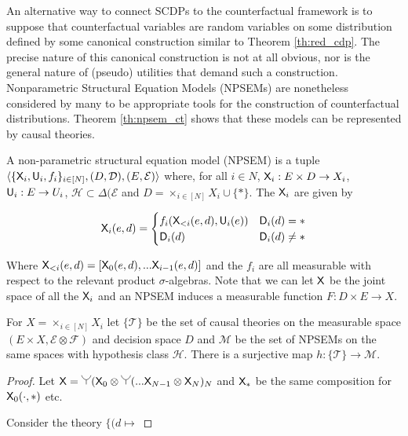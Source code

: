 An alternative way to connect SCDPs to the counterfactual framework is to suppose that counterfactual variables are random variables on some distribution defined by some canonical construction similar to Theorem \ref{th:red_cdp}. The precise nature of this canonical construction is not at all obvious, nor is the general nature of (pseudo) utilities that demand such a construction. Nonparametric Structural Equation Models (NPSEMs) are nonetheless considered by many to be appropriate tools for the construction of counterfactual distributions. Theorem \ref{th:npsem_ct} shows that these models can be represented by causal theories.

\begin{definition}[NPSEM]\label{def:NPSEM}
A non-parametric structural equation model (NPSEM) is a tuple $\langle \{\mathsf{X}_i, \mathsf{U}_i, f_i\}_{i\in[N]}, (D,\mathcal{D}), (E,\mathcal{E})\rangle$ where, for all $i\in N$, $\mathsf{X}_i:E\times D \to X_i$, $\mathsf{U}_i:E\to U_i$, $\mathscr{H}\subset\Delta(\mathcal{E}$ and $D=\times_{i\in[N]} X_i\cup\{*\}$. The $\mathsf{X}_i$ are given by

\begin{align}
    \mathsf{X}_i(e,d) = \begin{cases} f_i(\mathsf{X}_{<i}(e,d),\mathsf{U}_i(e)) &\mathsf{D}_i(d)=*\\ 
    \mathsf{D}_i(d)  &\mathsf{D}_i(d)\neq * \end{cases}
\end{align}

Where $\mathsf{X}_{<i}(e,d)=[\mathsf{X}_0(e,d),...\mathsf{X}_{i-1}(e,d)]$ and the $f_i$ are all measurable with respect to the relevant product $\sigma$-algebras. Note that we can let $\mathsf{X}$ be the joint space of all the $\mathsf{X}_i$ and an NPSEM induces a measurable function $F:D\times E\to X$.
\end{definition}

\begin{theorem}\label{th:npsem_ct}
For $X=\times_{i\in[N]}X_i$ let $\{\mathscr{T}\}$ be the set of causal theories on the measurable space $(E\times X,\mathcal{E}\otimes\mathcal{F})$ and decision space $D$ and $\mathscr{M}$ be the set of NPSEMs on the same spaces with hypothesis class $\mathscr{H}$. There is a surjective map $h:\{\mathscr{T}\}\to \mathscr{M}$.
\end{theorem}

\begin{proof}
Let $\RV{X}=\splitter{0.15}(\RV{X}_0\otimes\splitter{0.15}(...\RV{X}_{N-1}\otimes\RV{X}_N)_N$ and $\mathsf{X}_*$ be the same composition for $\mathsf{X}_0(\cdot,*)$ etc.

Consider the theory $\{(d\mapsto $
\end{proof}